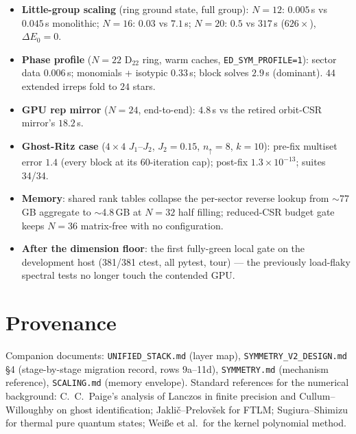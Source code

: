 \documentclass[11pt]{article}
\newcommand{\file}[1]{\texttt{\small #1}}
\begin{document}
\begin{itemize}
\item \textbf{Little-group scaling} (ring ground state, full group):
  $N{=}12$: $0.005$\,s vs $0.045$\,s monolithic; $N{=}16$: $0.03$ vs
  $7.1$\,s; $N{=}20$: $0.5$ vs $317$\,s ($626\times$), $\Delta E_0 = 0$.
\item \textbf{Phase profile} ($N{=}22$ D$_{22}$ ring, warm caches,
  \texttt{ED\_SYM\_PROFILE=1}): sector data $0.006$\,s; monomials + isotypic
  $0.33$\,s; block solves $2.9$\,s (dominant). $44$ extended irreps fold to
  $24$ stars.
\item \textbf{GPU rep mirror} ($N{=}24$, end-to-end): $4.8$\,s vs the
  retired orbit-CSR mirror's $18.2$\,s.
\item \textbf{Ghost-Ritz case} ($4{\times}4$ $J_1$--$J_2$, $J_2{=}0.15$,
  $n_\uparrow{=}8$, $k{=}10$): pre-fix multiset error $1.4$ (every block at
  its 60-iteration cap); post-fix $1.3\times10^{-13}$; suites 34/34.
\item \textbf{Memory}: shared rank tables collapse the per-sector reverse
  lookup from $\sim$77\,GB aggregate to $\sim$4.8\,GB at $N{=}32$ half
  filling; reduced-CSR budget gate keeps $N{=}36$ matrix-free with no
  configuration.
\item \textbf{After the dimension floor}: the first fully-green local gate
  on the development host (381/381 ctest, all pytest, tour) --- the
  previously load-flaky spectral tests no longer touch the contended GPU.
\end{itemize}

\section*{Provenance}

Companion documents: \file{UNIFIED\_STACK.md} (layer map),
\file{SYMMETRY\_V2\_DESIGN.md} \S4 (stage-by-stage migration record, rows
9a--11d), \file{SYMMETRY.md} (mechanism reference), \file{SCALING.md}
(memory envelope). Standard references for the numerical background:
C.~C.~Paige's analysis of Lanczos in finite precision and Cullum--Willoughby
on ghost identification; Jakli\v{c}--Prelov\v{s}ek for FTLM;
Sugiura--Shimizu for thermal pure quantum states; Wei\ss{}e et al.\ for the
kernel polynomial method.
\end{document}
